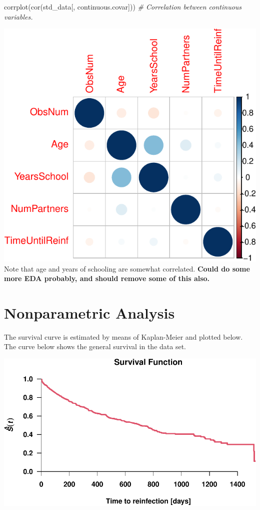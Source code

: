 \documentclass[
]{article}
\newenvironment{Shaded}{\begin{snugshade}}{\end{snugshade}}
\newcommand{\CommentTok}[1]{\textcolor[rgb]{0.56,0.35,0.01}{\textit{#1}}}
\newcommand{\FunctionTok}[1]{\textcolor[rgb]{0.00,0.00,0.00}{#1}}
\newcommand{\NormalTok}[1]{#1}
\begin{document}
\begin{Shaded}
\begin{Highlighting}[]
\FunctionTok{corrplot}\NormalTok{(}\FunctionTok{cor}\NormalTok{(std\_data[, continuous.covar])) }\CommentTok{\# Correlation between continuous variables. }
\end{Highlighting}
\end{Shaded}

\includegraphics{practical_files/figure-latex/unnamed-chunk-6-2.pdf}
Note that age and years of schooling are somewhat correlated. \textbf{Could do some more EDA probably, and should remove some of this also.}

\hypertarget{nonparametric-analysis}{%
\section{Nonparametric Analysis}\label{nonparametric-analysis}}

The survival curve is estimated by means of Kaplan-Meier and plotted below. The curve below shows the general survival in the data set.

\includegraphics{practical_files/figure-latex/unnamed-chunk-7-1.pdf}
\end{document}
